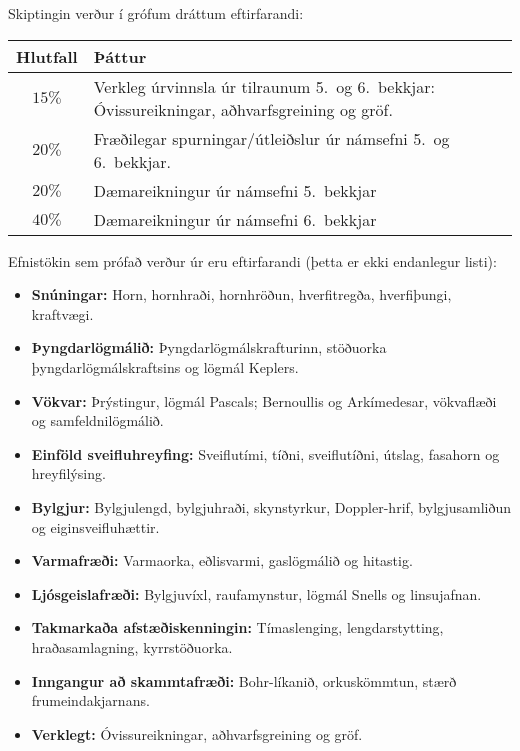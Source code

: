Skiptingin verður í grófum dráttum eftirfarandi:

\begin{table}[H]
    \centering
    \begin{tabular}{|c|l|}
    \hline
        Hlutfall & \hspace{0.75cm}Þáttur \\ \hline \hline
        $15 \%$ & Verkleg úrvinnsla úr tilraunum 5.~og 6.~bekkjar: Óvissureikningar, aðhvarfsgreining og gröf. \\ \hline
        $20 \%$ & Fræðilegar spurningar/útleiðslur úr námsefni 5.~og 6.~bekkjar. \\ \hline
        $20 \%$ & Dæmareikningur úr námsefni 5.~bekkjar \\ \hline
        $40 \%$ & Dæmareikningur úr námsefni 6.~bekkjar \\ \hline
    \end{tabular}
\end{table}



Efnistökin sem prófað verður úr eru eftirfarandi (þetta er ekki endanlegur listi):

\begin{itemize}
    \item \textbf{Snúningar:} Horn, hornhraði, hornhröðun, hverfitregða, hverfiþungi, kraftvægi.
    \item \textbf{Þyngdarlögmálið:} Þyngdarlögmálskrafturinn, stöðuorka þyngdarlögmálskraftsins og lögmál Keplers.
    \item \textbf{Vökvar:} Þrýstingur, lögmál Pascals; Bernoullis og Arkímedesar, vökvaflæði og samfeldnilögmálið.
    \item \textbf{Einföld sveifluhreyfing:} Sveiflutími, tíðni, sveiflutíðni, útslag, fasahorn og hreyfilýsing.
    \item \textbf{Bylgjur:} Bylgjulengd, bylgjuhraði, skynstyrkur, Doppler-hrif, bylgjusamliðun og eiginsveifluhættir.
    \item \textbf{Varmafræði:} Varmaorka, eðlisvarmi, gaslögmálið og hitastig.
    \item \textbf{Ljósgeislafræði:} Bylgjuvíxl, raufamynstur, lögmál Snells og linsujafnan.
    \item \textbf{Takmarkaða afstæðiskenningin:} Tímaslenging, lengdarstytting, hraðasamlagning, kyrrstöðuorka.
    \item \textbf{Inngangur að skammtafræði:} Bohr-líkanið, orkuskömmtun, stærð frumeindakjarnans.
    \item \textbf{Verklegt:} Óvissureikningar, aðhvarfsgreining og gröf.
\end{itemize}

